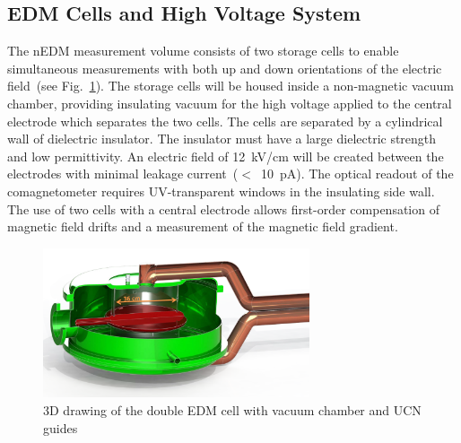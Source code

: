 

\subsection{ EDM Cells and High Voltage System}
The nEDM measurement volume consists of two storage cells to enable
simultaneous measurements with both up and down orientations of the
electric field~(see Fig.~\ref{fig:HVcell}). The storage cells will be
housed inside a non-magnetic vacuum chamber, providing insulating
vacuum for the high voltage applied to the central electrode which
separates the two cells.  The cells are separated by a cylindrical
wall of dielectric insulator.  The insulator must have a large
dielectric strength and low permittivity.  An electric field of
12~kV/cm will be created between the electrodes with minimal leakage
current~($<$~10~pA).  The optical readout of the comagnetometer
requires UV-transparent windows in the insulating side wall. The use
of two cells with a central electrode allows first-order compensation
of magnetic field drifts and a measurement of the magnetic field
gradient.

\begin{figure}[h!]
  \centering
  \includegraphics[width=0.7\textwidth]{HVcell.png}
  \caption{3D drawing of the double EDM cell with vacuum chamber and
    UCN guides}
  \label{fig:HVcell}
\end{figure}



